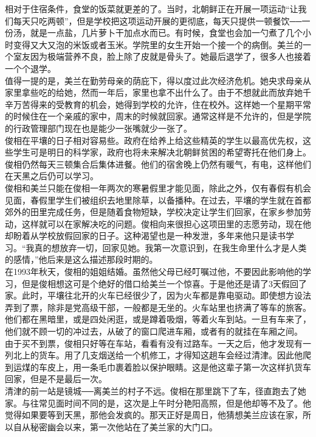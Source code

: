 相对于住宿条件，食堂的饭菜就更差的了。当时，北朝鲜正在开展一项运动“让我们每天只吃两顿”，但是学校把这项运动开展的更彻底，每天只提供一顿餐饮──一份汤，就是一点盐，几片萝卜干加点水而已。有时候，食堂也会加一勺煮了几个小时变得又大又泡的米饭或者玉米。学院里的女生开始一个接一个的病倒。美兰的一个室友因为极端营养不良，脸上除了皮就是骨头了。她最后退学了，很多人也接着一个个退学。\\

值得一提的是，美兰在勤劳母亲的荫庇下，得以度过此次经济危机。她央求母亲从家里拿些吃的给她，然而一年后，家里也拿不出什么了。由于不想就此而放弃她千辛万苦得来的受教育的机会，她得到学校的允许，住在校外。这样她一个星期平常的时候住在一个亲戚的家中，周末的时候就回家。通常这样是不允许的，但是学院的行政管理部门现在也是能少一张嘴就少一张了。\\

俊相在平壤的日子相对容易些。政府在给养上给这些精英的学生以最高优先权，这些学生可是明日的科学家，政府也将未来解决北朝鲜贫困的希望寄托在他们身上。俊相仍然每天三顿集合后集体进餐。他们的宿舍晚上仍然有暖气，有电，这样他们在天黑之后仍可以学习。\\

俊相和美兰只能在俊相一年两次的寒暑假里才能见面，除此之外，仅有春假有机会见面，春假里学生们被组织去地里除草，以备播种。在过去，平壤的学生就在首都郊外的田里完成任务，但是随着食物短缺，学校决定让学生们回家，在家乡参加劳动，这样就可以在家解决吃的问题。俊相向来很担心这项田里的志愿劳动，现在他却盼着从学校放假回家的日子。这种渴望也是一种发泄，多年来他只是读书学习。“我真的想放弃一切，回家见她。我第一次意识到，在我生命里什么才是人类的感情，”他后来是这么描述那段时期的。\\

在1993年秋天，俊相的姐姐结婚。虽然他父母已经叮嘱过他，不要因此影响他的学习，但是俊相想这可是个绝好的借口给美兰一个惊喜。于是他还是请了3天假回了家。此时，平壤往北开的火车已经很少了，因为火车都是靠电驱动。即使想方设法弄到了票，除非是党高级干部，一般都是无坐的。火车站里也挤满了等车的旅客。他们都在黑暗里，或是四处闲逛，或是蹲着吸烟，等着火车到站。一旦有车来了，他们就不顾一切的冲过去，从破了的窗口爬进车厢，或者有的就挂在车厢之间。\\

由于买不到票，俊相只好等在车站，看看有没有过路车。一天之后，他才发现有一列北上的货车。用了几支烟送给一个机修工，才得知这趟车会经过清津。因此他爬到运煤的车皮上，用一条毛巾裹着脸以保护眼睛。这是他这辈子第一次这样扒货车回家，但是不是最后一次。\\

清津的前一站是镜城──离美兰的村子不远。俊相在那里跳下了车，径直跑去了她家。与往常见面时间不同的是，这次是上午时分艳阳高照，但是他却等不及了。他觉得如果要等到天黑，那他会发疯的。那天正好是周日，他猜想美兰应该在家，所以自从秘密幽会以来，第一次他站在了美兰家的大门口。\\

